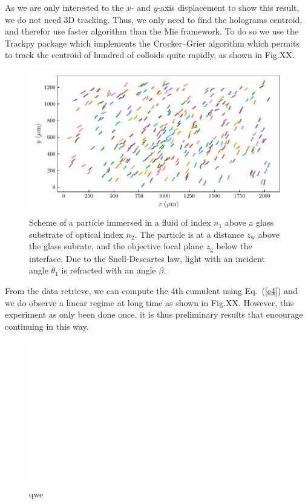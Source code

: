 As we are only interested to the $x$- and $y$-axis displacement to show this result, we do not need 3D tracking. Thus, we only need to find the holograms centroid, and therefor use faster algorithm than the Mie framework. To do so we use the Trackpy package \href{https://github.com/soft-matter/trackpy}{\faGithub} \cite{allan_soft-mattertrackpy_2021} which implements the Crocker–Grier algorithm \cite{crocker_methods_1996} which permits to track the centroid of hundred of colloids quite rapidly, as shown in Fig.XX.
\begin{figure}[H]
	\centering
	\includegraphics{02_body/chapter4/images/4th_cumulent/trajectories.pdf}
	\caption{Scheme of a particle immersed in a fluid of index $n_1$ above a glass substrate of optical index $n_2$. The particle is at a distance $z_\mathrm{w}$ above the glass subrate, and the objective focal plane $z_\mathrm{g}$ below the interface. Due to the Snell-Descartes law, light with an incident angle $\theta_1$ is refracted with an angle $\beta$. }
	\label{fig.trajtrackpy}
\end{figure}
From the data retrieve, we can compute the 4th cumulent using Eq.~(\ref{c4}) and we do observe a linear regime at long time as shown in Fig.XX. However, this experiment as only been done once, it is thus preliminary results that encourage continuing in this way.
\begin{figure}[H]
	\centering
	\includegraphics{02_body/chapter4/images/4th_cumulent/fourth.pdf}
	\caption{qwe  }
	\label{fig.forth}
\end{figure}

